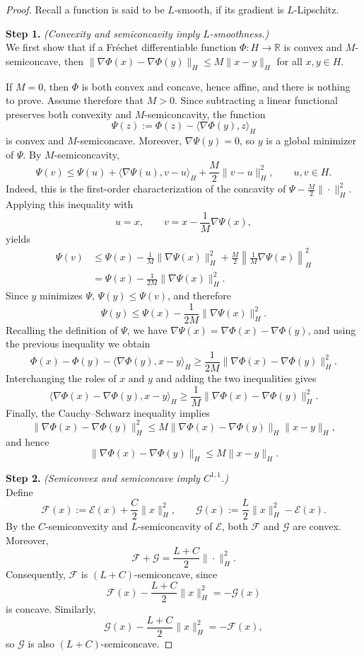 \documentclass[12pt]{amsart}
\numberwithin{equation}{section}
\begin{document}
\begin{proof}
Recall a function is said to be $L$-smooth, if its gradient is $L$-Lipschitz. 

\textbf{Step 1.} \textit{(Convexity and semiconcavity imply $L$-smoothness.)}\\
We first show that if a Fr\'echet differentiable function
$\Phi:H\to\mathbb R$ is convex and $M$-semiconcave, then $\|\nabla\Phi(x)-\nabla\Phi(y)\|_H \le M\|x-y\|_H$ for all $x,y\in H.$

If $M=0$, then $\Phi$ is both convex and concave, hence affine, and there is nothing to prove. Assume therefore that $M>0$. Since subtracting a linear functional preserves both convexity and $M$-semiconcavity, the function
\[
\Psi(z):=\Phi(z)-\langle\nabla\Phi(y),z\rangle_H
\]
is convex and $M$-semiconcave. Moreover, $\nabla\Psi(y)=0$,  so  $y$ is a global minimizer of $\Psi$. By $M$-semiconcavity,
\[
\Psi(v) \le \Psi(u) + \langle\nabla\Psi(u),v-u\rangle_H + \frac{M}{2}\|v-u\|_H^2, \qquad u,v\in H.
\]
Indeed, this is the first-order characterization of the concavity of
$\Psi-\frac{M}{2}\|\cdot\|_H^2$. Applying this inequality with
\[
u=x, \qquad v=x-\frac1M\nabla\Psi(x),
\]
yields
\[
\begin{aligned}
    \Psi(v)
    & \le \Psi(x) - \frac{1}{M}\|\nabla\Psi(x)\|_H^2 + \frac{M}{2} \left\| \frac1M\nabla\Psi(x) \right\|_H^2 \\
    & = \Psi(x) - \frac{1}{2M} \|\nabla\Psi(x)\|_H^2.
\end{aligned}
\]
Since $y$ minimizes $\Psi$, $\Psi(y)\le\Psi(v)$, and therefore
\[
\Psi(y) \le \Psi(x) - \frac1{2M} \|\nabla\Psi(x)\|_H^2.
\]
Recalling the definition of $\Psi$, we have $\nabla \Psi(x) = \nabla \Phi(x) - \nabla \Phi(y)$, and using the previous inequality we obtain
\[
\Phi(x)-\Phi(y) - \langle\nabla\Phi(y),x-y\rangle_H \ge \frac{1}{2M} \|\nabla\Phi(x)-\nabla\Phi(y)\|_H^2.
\]
Interchanging the roles of $x$ and $y$ and adding the two inequalities
gives
\[
\langle \nabla\Phi(x)-\nabla\Phi(y), x-y \rangle_H \ge \frac{1}{M} \|\nabla\Phi(x)-\nabla\Phi(y)\|_H^2.
\]
Finally, the Cauchy--Schwarz inequality implies
\[
\|\nabla\Phi(x)-\nabla\Phi(y)\|_H^2 \le M \|\nabla\Phi(x)-\nabla\Phi(y)\|_H \|x-y\|_H,
\]
and hence
\[
\|\nabla\Phi(x)-\nabla\Phi(y)\|_H \le M\|x-y\|_H.
\]

\textbf{Step 2.} \textit{(Semiconvex and semiconcave imply $C^{1,1}$.)}\\
Define
\[
\mathscr{F}(x) := \mathscr{E}(x)+\frac{C}{2}\|x\|_H^2, \qquad \mathscr{G}(x) := \frac{L}{2}\|x\|_H^2-\mathscr{E}(x).
\]
By the $C$-semiconvexity and $L$-semiconcavity of $\mathscr{E}$, both $\mathscr{F}$ and $\mathscr{G}$ are convex. Moreover,
\[
\mathscr{F}+\mathscr{G} = \frac{L+C}{2}\|\cdot\|_H^2.
\]
Consequently, $\mathscr{F}$ is $(L+C)$-semiconcave, since
\[
\mathscr{F}(x)-\frac{L+C}{2}\|x\|_H^2 = -\mathscr{G}(x)
\]
is concave. Similarly,
\[
\mathscr{G}(x)-\frac{L+C}{2}\|x\|_H^2 = -\mathscr{F}(x),
\]
so $\mathscr{G}$ is also $(L+C)$-semiconcave.


\end{proof}
\end{document}
